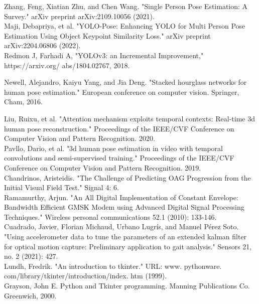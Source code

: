 \begin{thebibliography}{9}
Zhang, Feng, Xiatian Zhu, and Chen Wang. "Single Person Pose Estimation: A Survey." arXiv preprint arXiv:2109.10056 (2021).\\

Maji, Debapriya, et al. "YOLO-Pose: Enhancing YOLO for Multi Person Pose Estimation Using Object Keypoint Similarity Loss." arXiv preprint arXiv:2204.06806 (2022).\\

Redmon J, Farhadi A, "YOLOv3: an Incremental Improvement," https://arxiv.org/
abs/1804.02767, 2018.

Newell, Alejandro, Kaiyu Yang, and Jia Deng. "Stacked hourglass networks for human pose estimation." European conference on computer vision. Springer, Cham, 2016.

Liu, Ruixu, et al. "Attention mechanism exploits temporal contexts: Real-time 3d human pose reconstruction." Proceedings of the IEEE/CVF Conference on Computer Vision and Pattern Recognition. 2020.\\

Pavllo, Dario, et al. "3d human pose estimation in video with temporal convolutions and semi-supervised training." Proceedings of the IEEE/CVF Conference on Computer Vision and Pattern Recognition. 2019.\\

Chandrinos, Aristeidis. "The Challenge of Predicting OAG Progression from the Initial Visual Field Test." Signal 4: 6.\\

Ramamurthy, Arjun. "An All Digital Implementation of Constant Envelope: Bandwidth Efficient GMSK Modem using Advanced Digital Signal Processing Techniques." Wireless personal communications 52.1 (2010): 133-146.\\

Cuadrado, Javier, Florian Michaud, Urbano Lugrís, and Manuel Pérez Soto. "Using accelerometer data to tune the parameters of an extended kalman filter for optical motion capture: Preliminary application to gait analysis." Sensors 21, no. 2 (2021): 427.\\

Lundh, Fredrik. "An introduction to tkinter." URL: www. pythonware. com/library/tkinter/introduction/index. htm (1999).\\

Grayson, John E. Python and Tkinter programming. Manning Publications Co. Greenwich, 2000.\\



\end{thebibliography}

